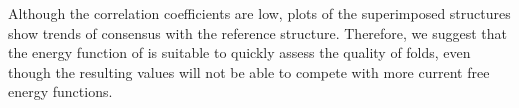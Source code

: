 \documentclass[11pt,a4paper]{article}
\begin{document}
Although the correlation coefficients are low, plots of the superimposed
structures show trends of consensus with the reference structure.
Therefore, we suggest that the energy function of \citet{Zhang1997} is suitable
to quickly assess the quality of folds, even though the resulting values will not
be able to compete with more current free energy functions.


%



\end{document}
